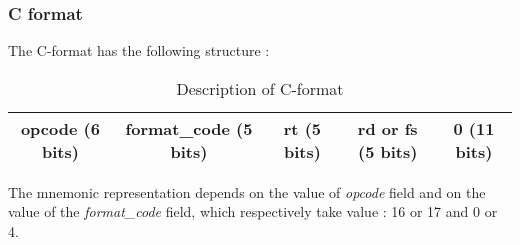 \subsubsection*{C format}

	The C-format has the following structure :
	\begin{table}[H]
		\centering
		\begin{tabular}{|c|c|c|c|c|}
		\hline 
		opcode (6 bits) & format\_code (5 bits) & rt (5 bits) & rd or fs (5 bits) & 0 (11 bits) \\ 
		\hline 
		\end{tabular} 
		\caption{Description of C-format}
	\end{table}
	
	The mnemonic representation depends on the value of \textit{opcode} field and on the value of the \textit{format\_code} field, which respectively take value : 16 or 17 and 0 or 4.